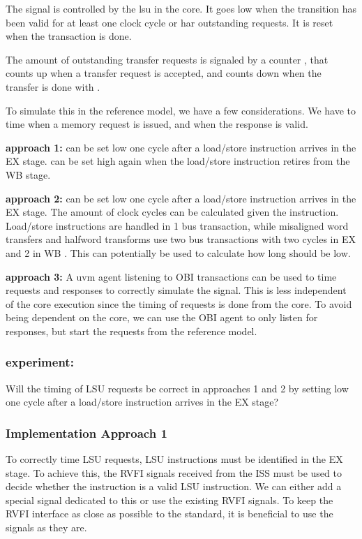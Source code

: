 The  signal is controlled by the \acrshort{lsu} in the core. It goes low when the transition has been valid for at least one clock cycle or har outstanding requests. It is reset when the transaction is done. 

The amount of outstanding transfer requests is signaled by a counter , that counts up when a transfer request is accepted, and counts down when the transfer is done with .

To simulate this in the reference model, we have a few considerations. We have to time when a memory request is issued, and when the response is valid.

\textbf{approach 1:}
 can be set low one cycle after a load/store instruction arrives in the EX stage.
 can be set high again when the load/store instruction retires from the WB stage.

\textbf{approach 2:}
 can be set low one cycle after a load/store instruction arrives in the EX stage.
The amount of clock cycles can be calculated given the instruction. Load/store instructions are handled in 1 bus transaction, while misaligned word transfers and halfword transforms use two bus transactions with two cycles in EX and 2 in WB \cite{openhwgroupPipelineDetails2023}. This can potentially be used to calculate how long  should be low.

\textbf{approach 3:}
A uvm agent listening to OBI transactions can be used to time requests and responses to correctly simulate the  signal. This is less independent of the core execution since the timing of requests is done from the core. To avoid being dependent on the core, we can use the OBI agent to only listen for responses, but start the requests from the reference model.


\subsubsection{experiment:}
Will the timing of LSU requests be correct in approaches 1 and 2 by setting  low one cycle after a load/store instruction arrives in the EX stage?

\subsubsection{Implementation Approach 1}

To correctly time LSU requests, LSU instructions must be identified in the EX stage. To achieve this, the RVFI signals received from the ISS must be used to decide whether the instruction is a valid LSU instruction. We can either add a special signal dedicated to this or use the existing RVFI signals. To keep the RVFI interface as close as possible to the standard, it is beneficial to use the signals as they are. 


